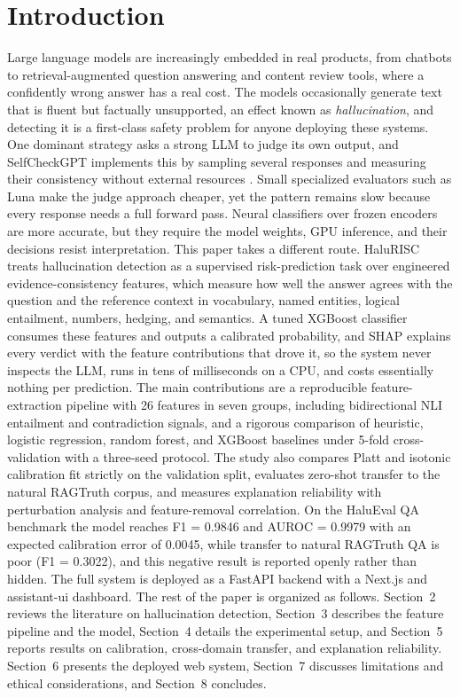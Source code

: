 \section{Introduction}

Large language models are increasingly embedded in real products, from chatbots to retrieval-augmented question answering and content review tools, where a confidently wrong answer has a real cost. The models occasionally generate text that is fluent but factually unsupported, an effect known as \emph{hallucination}, and detecting it is a first-class safety problem for anyone deploying these systems. One dominant strategy asks a strong LLM to judge its own output, and SelfCheckGPT implements this by sampling several responses and measuring their consistency without external resources \cite{selfcheck}. Small specialized evaluators such as Luna \cite{luna} make the judge approach cheaper, yet the pattern remains slow because every response needs a full forward pass. Neural classifiers over frozen encoders \cite{ieeeTai} are more accurate, but they require the model weights, GPU inference, and their decisions resist interpretation. This paper takes a different route. HaluRISC treats hallucination detection as a supervised risk-prediction task over engineered evidence-consistency features, which measure how well the answer agrees with the question and the reference context in vocabulary, named entities, logical entailment, numbers, hedging, and semantics. A tuned XGBoost classifier consumes these features and outputs a calibrated probability, and SHAP explains every verdict with the feature contributions that drove it, so the system never inspects the LLM, runs in tens of milliseconds on a CPU, and costs essentially nothing per prediction. The main contributions are a reproducible feature-extraction pipeline with 26 features in seven groups, including bidirectional NLI entailment and contradiction signals, and a rigorous comparison of heuristic, logistic regression, random forest, and XGBoost baselines under 5-fold cross-validation with a three-seed protocol. The study also compares Platt and isotonic calibration fit strictly on the validation split, evaluates zero-shot transfer to the natural RAGTruth corpus, and measures explanation reliability with perturbation analysis and feature-removal correlation. On the HaluEval QA benchmark the model reaches F1 = 0.9846 and AUROC = 0.9979 with an expected calibration error of 0.0045, while transfer to natural RAGTruth QA is poor (F1 = 0.3022), and this negative result is reported openly rather than hidden. The full system is deployed as a FastAPI backend with a Next.js and assistant-ui dashboard. The rest of the paper is organized as follows. Section~2 reviews the literature on hallucination detection, Section~3 describes the feature pipeline and the model, Section~4 details the experimental setup, and Section~5 reports results on calibration, cross-domain transfer, and explanation reliability. Section~6 presents the deployed web system, Section~7 discusses limitations and ethical considerations, and Section~8 concludes.
